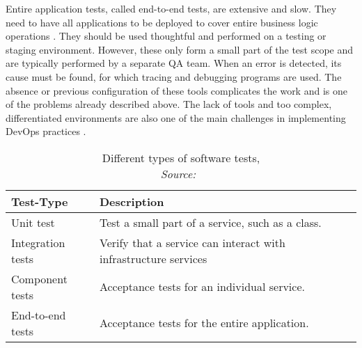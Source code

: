 \documentclass[12pt, a4paper]{article}
\begin{document}
        Entire application tests, called end-to-end tests, are extensive and slow. They need to have all applications to be deployed to cover entire business logic operations \cite{microtest}. They should be used thoughtful and performed on a testing or staging environment. However, these only form a small part of the test scope and are typically performed by a separate \ac{QA} team. When an error is detected, its cause must be found, for which tracing and debugging programs are used. The absence or previous configuration of these tools complicates the work and is one of the problems already described above. The lack of tools and too complex, differentiated environments are also one of the main challenges in implementing DevOps practices \cite{devops_challenge}.

        \begin{table}[]
            \centering
            \begin{tabularx}{0.9\textwidth}{lX}
                Test-Type & Description \\ \midrule\midrule
                Unit test& Test a small part of a service, such as a class.\\
                Integration tests & Verify that a service can interact with infrastructure services \\
                Component tests & Acceptance tests for an individual service. \\
                End-to-end tests & Acceptance tests for the entire application.
            \end{tabularx}
            \caption{Different types of software tests, \\\textit{Source:~\cite{microtest}}}\label{tab::tests}
        \end{table}
\end{document}
